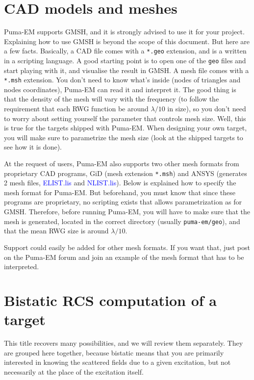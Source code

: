 \documentclass[a4paper,10pt]{book}
\newcommand{\file}[1] {\textcolor{blue}{\textsf{#1}}}
\begin{document}
\section{CAD models and meshes}
%
\par
Puma-EM supports GMSH, and it is strongly advised to use it for your project. Explaining how to use GMSH is beyond the scope of this document. But here are a few facts. Basically, a CAD file comes with a \texttt{*.geo} extension, and is a written in a scripting language. A good starting point is to open one of the \texttt{geo} files and start playing with it, and visualise the result in GMSH. A mesh file comes with a \texttt{*.msh} extension. You don't need to know what's inside (nodes of triangles and nodes coordinates), Puma-EM can read it and interpret it. The good thing is that the density of the mesh will vary with the frequency (to follow the requirement that each RWG function be around $\lambda/10$ in size), so you don't need to worry about setting yourself the parameter that controls mesh size. Well, this is true for the targets shipped with Puma-EM. When designing your own target, you will make sure to parametrize the mesh size (look at the shipped targets to see how it is done).
%
\par
At the request of users, Puma-EM also supports two other mesh formats from proprietary CAD programs, GiD (mesh extension \texttt{*.msh}) and ANSYS (generates 2 mesh files, \file{ELIST.lis} and \file{NLIST.lis}). Below is explained how to specify the mesh format for Puma-EM. But beforehand, you must know that since these programs are proprietary, no scripting exists that allows parametrization as for GMSH. Therefore, before running Puma-EM, you will have to make sure that the mesh is generated, located in the correct directory (usually \texttt{puma-em/geo}), and that the mean RWG size is around $\lambda/10$.
%
\par
Support could easily be added for other mesh formats. If you want that, just post on the Puma-EM forum and join an example of the mesh format that has to be interpreted.

\section{Bistatic RCS computation of a target}
%
\par
This title recovers many possibilities, and we will review them separately. They are grouped here together, because bistatic means that you are primarily interested in knowing the scattered fields due to a given excitation, but not necessarily at the place of the excitation itself.
\end{document}
